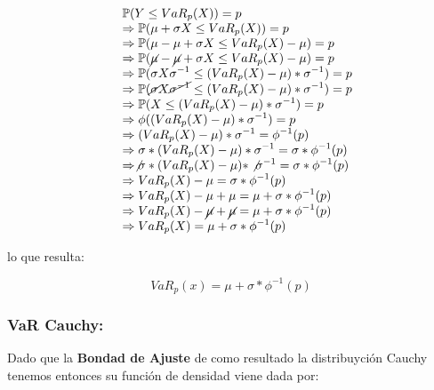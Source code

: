 \documentclass[]{article}
\begin{document}
\[
\begin{array}{rl}
&\displaystyle \mathbb{P}(Y \leq VaR_{p}(X)) = p\\
&\displaystyle \Rightarrow \mathbb{P}(\mu + \sigma X \leq VaR_{p}(X)) = p\\
&\displaystyle \Rightarrow \mathbb{P}(\mu - \mu + \sigma X \leq VaR_{p}(X)- \mu) = p\\
&\displaystyle \Rightarrow \mathbb{P}(\cancel{\mu} - \cancel{\mu} + \sigma X \leq VaR_{p}(X)- \mu) = p\\
&\displaystyle \Rightarrow \mathbb{P}(\sigma X \sigma^{-1} \leq (VaR_{p}(X) -\mu) * \sigma^{-1}) = p\\
&\displaystyle \Rightarrow \mathbb{P}(\cancel{\sigma} X \cancel{\sigma^{-1}} \leq (VaR_{p}(X) -\mu) * \sigma^{-1}) = p\\
&\displaystyle \Rightarrow \mathbb{P}(X \leq (VaR_{p}(X) -\mu) * \sigma^{-1}) = p\\
&\displaystyle \Rightarrow \phi((VaR_{p}(X) -\mu) * \sigma^{-1}) = p\\
&\displaystyle \Rightarrow (VaR_{p}(X) -\mu) * \sigma^{-1} = \phi^{-1}(p)\\
&\displaystyle \Rightarrow \sigma * {(VaR_{p}(X) -\mu) * \sigma^{-1}} = \sigma * \phi^{-1}(p)\\
&\displaystyle \Rightarrow \not{\sigma} * {(VaR_{p}(X) -\mu) * \not{\sigma^{-1}}} = \sigma * \phi^{-1}(p)\\
&\displaystyle \Rightarrow VaR_{p}(X) -\mu = \sigma * \phi^{-1}(p)\\
&\displaystyle \Rightarrow VaR_{p}(X) -\mu + \mu = \mu + \sigma * \phi^{-1}(p)\\
&\displaystyle \Rightarrow VaR_{p}(X) -\cancel{\mu} + \cancel{\mu} = \mu + \sigma * \phi^{-1}(p)\\
&\displaystyle \Rightarrow VaR_{p}(X) = \mu + \sigma * \phi^{-1}(p)
\end{array}\]

lo que resulta:

\[VaR_p(x)=\mu+\sigma* \phi^{-1}(p)\]

\hypertarget{var-cauchy}{%
\subsubsection{\texorpdfstring{\textbf{VaR
Cauchy:}}{VaR Cauchy:}}\label{var-cauchy}}

Dado que la \textbf{Bondad de Ajuste} de como resultado la distribuyción
Cauchy tenemos entonces su función de densidad viene dada por:
\end{document}
